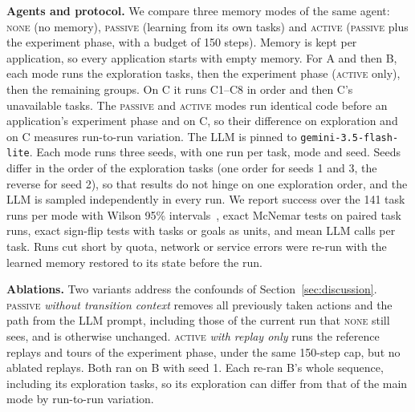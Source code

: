 \documentclass[conference]{IEEEtran}
\newcommand{\modeNone}{\textsc{none}}
\newcommand{\modePassive}{\textsc{passive}}
\newcommand{\modeActive}{\textsc{active}}
\begin{document}
\textbf{Agents and protocol.} We compare three memory modes of the same agent: \modeNone{} (no memory), \modePassive{} (learning from its own tasks) and \modeActive{} (\modePassive{} plus the experiment phase, with a budget of 150 steps). Memory is kept per application, so every application starts with empty memory. For A and then B, each mode runs the exploration tasks, then the experiment phase (\modeActive{} only), then the remaining groups. On C it runs C1--C8 in order and then C's unavailable tasks. The \modePassive{} and \modeActive{} modes run identical code before an application's experiment phase and on C, so their difference on exploration and on C measures run-to-run variation. The LLM is pinned to \texttt{gemini-3.5-flash-lite}. Each mode runs three seeds, with one run per task, mode and seed. Seeds differ in the order of the exploration tasks (one order for seeds 1 and 3, the reverse for seed 2), so that results do not hinge on one exploration order, and the LLM is sampled independently in every run. We report success over the 141 task runs per mode with Wilson 95\% intervals~\cite{wilson1927}, exact McNemar tests on paired task runs, exact sign-flip tests with tasks or goals as units, and mean LLM calls per task. Runs cut short by quota, network or service errors were re-run with the learned memory restored to its state before the run. %

\textbf{Ablations.} Two variants address the confounds of Section~\ref{sec:discussion}. \modePassive{} \emph{without transition context} removes all previously taken actions and the path from the LLM prompt, including those of the current run that \modeNone{} still sees, and is otherwise unchanged. \modeActive{} \emph{with replay only} runs the reference replays and tours of the experiment phase, under the same 150-step cap, but no ablated replays. Both ran on B with seed 1. Each re-ran B's whole sequence, including its exploration tasks, so its exploration can differ from that of the main mode by run-to-run variation.

\end{document}
